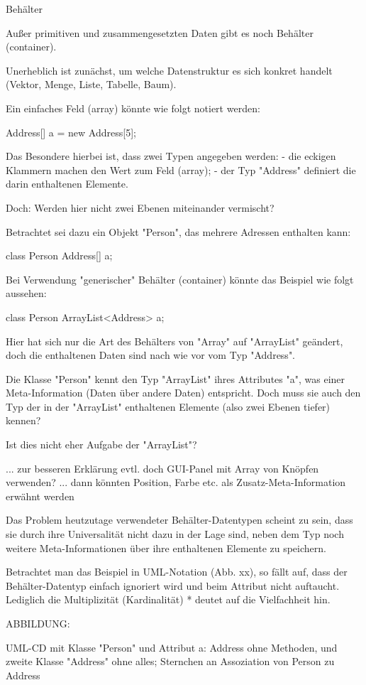 
Behälter

Außer primitiven und zusammengesetzten Daten gibt es
noch Behälter (container).

Unerheblich ist zunächst, um welche Datenstruktur es sich
konkret handelt (Vektor, Menge, Liste, Tabelle, Baum).

Ein einfaches Feld (array) könnte wie folgt notiert werden:

Address[] a = new Address[5];

Das Besondere hierbei ist, dass zwei Typen angegeben werden:
- die eckigen Klammern machen den Wert zum Feld (array);
- der Typ "Address" definiert die darin enthaltenen Elemente.

Doch: Werden hier nicht zwei Ebenen miteinander vermischt?

Betrachtet sei dazu ein Objekt "Person", das mehrere Adressen
enthalten kann:

class Person {
    Address[] a;
}

Bei Verwendung "generischer" Behälter (container) könnte das Beispiel
wie folgt aussehen:

class Person {
    ArrayList<Address> a;
}

Hier hat sich nur die Art des Behälters von "Array" auf "ArrayList"
geändert, doch die enthaltenen Daten sind nach wie vor vom Typ "Address".

Die Klasse "Person" kennt den Typ "ArrayList" ihres Attributes "a",
was einer Meta-Information (Daten über andere Daten) entspricht.
Doch muss sie auch den Typ der in der "ArrayList" enthaltenen
Elemente (also zwei Ebenen tiefer) kennen?

Ist dies nicht eher Aufgabe der "ArrayList"?

... zur besseren Erklärung evtl. doch GUI-Panel mit Array von Knöpfen verwenden?
... dann könnten Position, Farbe etc. als Zusatz-Meta-Information erwähnt werden

Das Problem heutzutage verwendeter Behälter-Datentypen scheint zu sein,
dass sie durch ihre Universalität nicht dazu in der Lage sind,
neben dem Typ noch weitere Meta-Informationen über ihre enthaltenen
Elemente zu speichern.

Betrachtet man das Beispiel in UML-Notation (Abb. xx),
so fällt auf, dass der Behälter-Datentyp einfach ignoriert wird
und beim Attribut nicht auftaucht. Lediglich die Multiplizität
(Kardinalität) * deutet auf die Vielfachheit hin.

ABBILDUNG:

UML-CD mit Klasse "Person" und Attribut a: Address ohne Methoden,
und zweite Klasse "Address" ohne alles; Sternchen an Assoziation von Person zu Address

